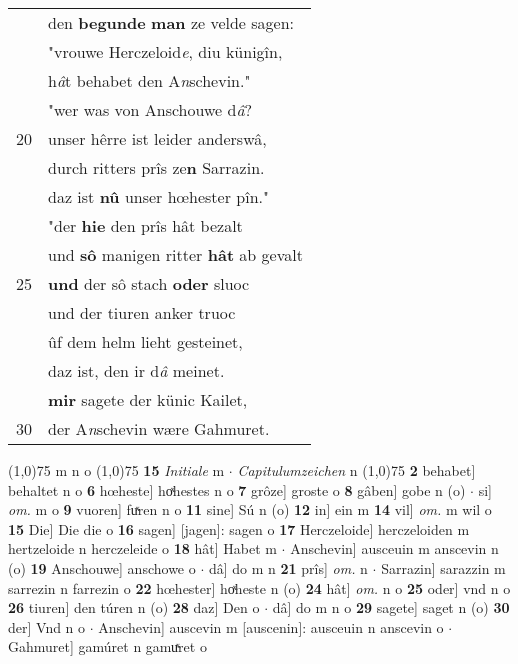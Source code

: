 \documentclass[8pt,a4paper,notitlepage]{article}
\begin{document}
\begin{table}[ht]
\begin{minipage}[t]{0.5\linewidth}
\begin{tabular}{rl}
 & den \textbf{begunde} \textbf{man} ze velde sagen:\\ 
 & "vrouwe Herczeloid\textit{e}, diu künigîn,\\ 
 & h\textit{â}t behabet den A\textit{n}schevin."\\ 
 & "wer was von Anschouwe d\textit{â}?\\ 
20 & unser hêrre ist leider anderswâ,\\ 
 & durch ritters prîs ze\textbf{n} Sarrazin.\\ 
 & daz ist \textbf{nû} unser hœhester pîn."\\ 
 & "der \textbf{hie} den prîs hât bezalt\\ 
 & und \textbf{sô} manigen ritter \textbf{hât} ab gevalt\\ 
25 & \textbf{und} der sô stach \textbf{oder} sluoc\\ 
 & und der tiuren anker truoc\\ 
 & ûf dem helm lieht gesteinet,\\ 
 & daz ist, den ir d\textit{â} meinet.\\ 
 & \textbf{mir} sagete der künic Kailet,\\ 
30 & der A\textit{n}schevin wære Gahmuret.\\ 
\end{tabular}
\scriptsize
\line(1,0){75} \newline
m n o \newline
\line(1,0){75} \newline
\textbf{15} \textit{Initiale} m   $\cdot$ \textit{Capitulumzeichen} n  \newline
\line(1,0){75} \newline
\textbf{2} behabet] behaltet n o \textbf{6} hœheste] hoͯhestes n o \textbf{7} grôze] groste o \textbf{8} gâben] gobe n (o)  $\cdot$ si] \textit{om.} m o \textbf{9} vuoren] fuͯren n o \textbf{11} sine] Sú n (o) \textbf{12} in] ein m \textbf{14} vil] \textit{om.} m wil o \textbf{15} Die] Die die o \textbf{16} sagen] [jagen]: sagen o \textbf{17} Herczeloide] herczeloiden m hertzeloide n herczeleide o \textbf{18} hât] Habet m  $\cdot$ Anschevin] ausceuin m anscevin n (o) \textbf{19} Anschouwe] anschowe o  $\cdot$ dâ] do m n \textbf{21} prîs] \textit{om.} n  $\cdot$ Sarrazin] sarazzin m sarrezin n farrezin o \textbf{22} hœhester] hoͯheste n (o) \textbf{24} hât] \textit{om.} n o \textbf{25} oder] vnd n o \textbf{26} tiuren] den túren n (o) \textbf{28} daz] Den o  $\cdot$ dâ] do m n o \textbf{29} sagete] saget n (o) \textbf{30} der] Vnd n o  $\cdot$ Anschevin] auscevin m [auscenin]: ausceuin n anscevin o  $\cdot$ Gahmuret] gamúret n gamuͯret o \newline
\end{minipage}
\end{table}
\end{document}

